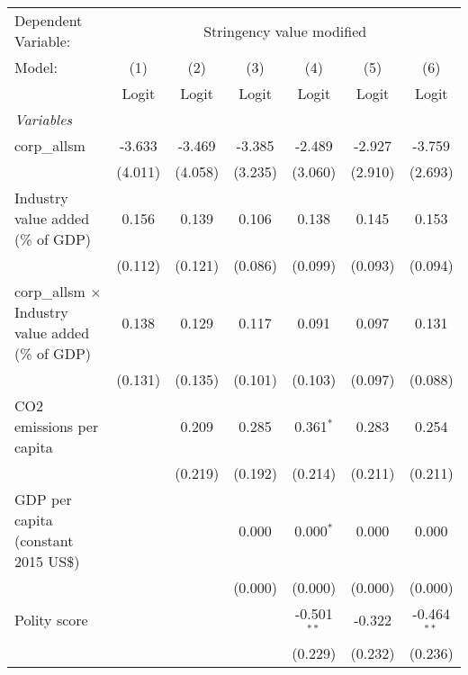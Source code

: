 
\begingroup
\centering
\begin{tabular}{lcccccc}
   \toprule
   Dependent Variable: & \multicolumn{6}{c}{Stringency value modified}\\
   Model:                                                   & (1)     & (2)     & (3)     & (4)           & (5)         & (6)\\  
                                                            &  Logit  & Logit   & Logit   & Logit         & Logit       & Logit\\  
   \midrule
   \emph{Variables}\\
   corp\_allsm                                              & -3.633  & -3.469  & -3.385  & -2.489        & -2.927      & -3.759\\   
                                                            & (4.011) & (4.058) & (3.235) & (3.060)       & (2.910)     & (2.693)\\   
   Industry value added (\% of GDP)                         & 0.156   & 0.139   & 0.106   & 0.138         & 0.145       & 0.153\\   
                                                            & (0.112) & (0.121) & (0.086) & (0.099)       & (0.093)     & (0.094)\\   
   corp\_allsm $\times$ Industry value added (\% of GDP)    & 0.138   & 0.129   & 0.117   & 0.091         & 0.097       & 0.131\\   
                                                            & (0.131) & (0.135) & (0.101) & (0.103)       & (0.097)     & (0.088)\\   
   CO2 emissions per capita                                 &         & 0.209   & 0.285   & 0.361$^{*}$   & 0.283       & 0.254\\   
                                                            &         & (0.219) & (0.192) & (0.214)       & (0.211)     & (0.211)\\   
   GDP per capita (constant 2015 US\$)                      &         &         & 0.000   & 0.000$^{*}$   & 0.000       & 0.000\\   
                                                            &         &         & (0.000) & (0.000)       & (0.000)     & (0.000)\\   
   Polity score                                             &         &         &         & -0.501$^{**}$ & -0.322      & -0.464$^{**}$\\   
                                                            &         &         &         & (0.229)       & (0.232)     & (0.236)\\   

\end{tabular}
